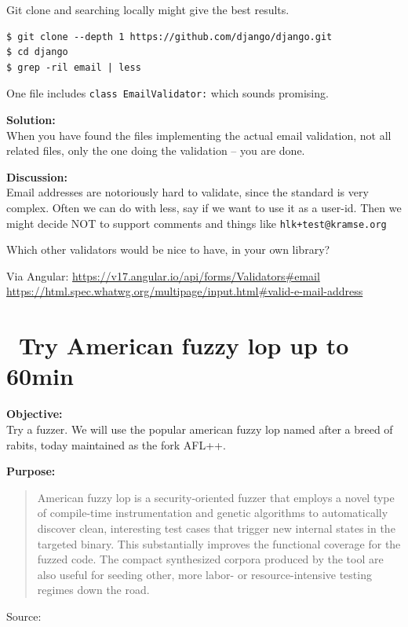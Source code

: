 \documentclass[a4paper,11pt,notitlepage]{report}
\begin{document}
Git clone and searching locally might give the best results.

\begin{verbatim}
$ git clone --depth 1 https://github.com/django/django.git
$ cd django
$ grep -ril email | less
\end{verbatim}

One file includes \verb+class EmailValidator:+ which sounds promising.

{\bf Solution:}\\
When you have found the files implementing the actual email validation, not all related files, only the one doing the validation -- you are done.

{\bf Discussion:}\\
Email addresses are notoriously hard to validate, since the standard is very complex. Often we can do with less, say if we want to use it as a user-id. Then we might decide NOT to support comments and things like \verb?hlk+test@kramse.org?

Which other validators would be nice to have, in your own library?

Via Angular: \url{https://v17.angular.io/api/forms/Validators#email}\\
\url{https://html.spec.whatwg.org/multipage/input.html#valid-e-mail-address}


\chapter{\faInfoCircle\ Try American fuzzy lop up to 60min}
\label{ex:american-fuzzy-lop}

{\bf Objective:}\\
Try a fuzzer. We will use the popular american fuzzy lop named after a breed of rabits, today maintained as the fork AFL++.

{\bf Purpose:}
\begin{quote}
American fuzzy lop is a security-oriented fuzzer that employs a novel type of compile-time instrumentation and genetic algorithms to automatically discover clean, interesting test cases that trigger new internal states in the targeted binary. This substantially improves the functional coverage for the fuzzed code. The compact synthesized corpora produced by the tool are also useful for seeding other, more labor- or resource-intensive testing regimes down the road.
\end{quote}
Source: 
\end{document}
